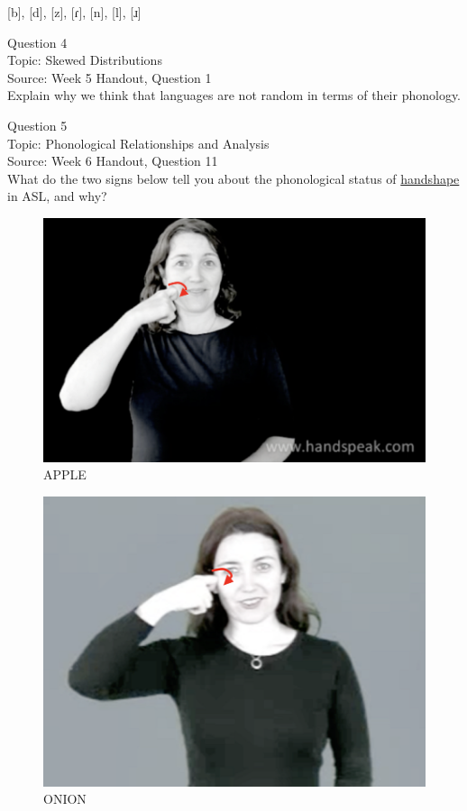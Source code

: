 \documentclass[12pt]{article}
\begin{document}
{[b]}, {[d]}, {[z]}, {[ɾ]}, {[n]}, {[l]}, {[ɹ]}


\newpage

{\large Question 4}\\

Topic: Skewed Distributions\\
Source: Week 5 Handout, Question 1\\

Explain why we think that languages are not random in terms of their phonology.\\


\newpage

{\large Question 5}\\

Topic: Phonological Relationships and Analysis\\
Source: Week 6 Handout, Question 11\\

What do the two signs below tell you about the phonological status of \underline{handshape} in ASL, and why?\\

\begin{figure}[H]
\includegraphics{../images/asl_apple.png}
\caption{APPLE}
\end{figure}
\begin{figure}[H]
\includegraphics{../images/asl_onion.png}
\caption{ONION}
\end{figure}
\end{document}

